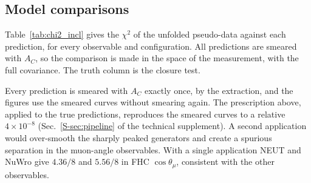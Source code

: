 \documentclass[11pt,a4paper]{article}
\newcommand{\suppref}[2]{#1~\ref{S-#2} of the technical supplement}
\begin{document}
\subsection{Model comparisons}
\label{sec:chi2}

Table~\ref{tab:chi2_incl} gives the $\chi^2$ of the unfolded pseudo-data against each prediction, for
every observable and configuration. All predictions are smeared with $A_C$, so the comparison is
made in the space of the measurement, with the full covariance. The truth column is the closure test.

Every prediction is smeared with $A_C$ exactly once, by the extraction, and the figures use the
smeared curves without smearing again. The prescription above, applied to the true predictions,
reproduces the smeared curves to a relative $4\times10^{-8}$ (\suppref{Sec.}{sec:pipeline}). A
second application would over-smooth the sharply peaked generators and create a spurious separation
in the muon-angle observables. With a single application NEUT and NuWro give $4.36/8$ and $5.56/8$ in
FHC $\cos\theta_\mu$, consistent with the other observables.
\end{document}
